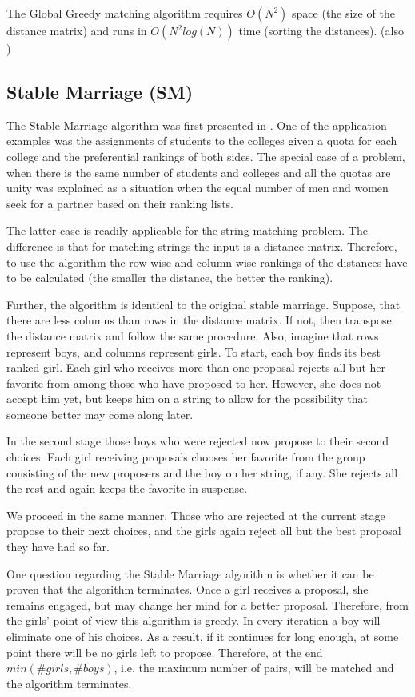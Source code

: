 \documentclass[a4paper,11pt]{article}
\begin{document}
The Global Greedy matching algorithm requires $O(N^2)$ space (the size of the distance matrix) and runs in $O(N^2 log(N))$ time (sorting the distances). (also \cite{augsten})

\subsection{Stable Marriage (SM)}

The Stable Marriage algorithm was first presented in \cite{gale}. One of the application examples was the assignments of students to the colleges given a quota for each college and the preferential rankings of both sides. The special case of a problem, when there is the same number of students and colleges and all the quotas are unity was explained as a situation when the equal number of men and women seek for a partner based on their ranking lists.

The latter case is readily applicable for the string matching problem. The difference is that for matching strings the input is a distance matrix. Therefore, to use the algorithm the row-wise and column-wise rankings of the distances have to be calculated (the smaller the distance, the better the ranking).

Further, the algorithm is identical to the original stable marriage. Suppose, that there are less columns than rows in the distance matrix. If not, then transpose the distance matrix and follow the same procedure. Also, imagine that rows represent boys, and columns represent girls. To start, each boy finds its best ranked girl. Each girl who receives more than one proposal rejects all but her favorite from among those who have proposed to her. However, she does not accept him yet, but keeps him on a string to allow for the possibility that someone better may come along later.

In the second stage those boys who were rejected now propose to their second choices. Each girl receiving proposals chooses her favorite from the group consisting of the new proposers and the boy on her string, if any. She rejects all the rest and again keeps the favorite in suspense.

We proceed in the same manner. Those who are rejected at the current stage propose to their next choices, and the girls again reject all but the best proposal they have had so far.

One question regarding the Stable Marriage algorithm is whether it can be proven that the algorithm terminates. Once a girl receives a proposal, she remains engaged, but may change her mind for a better proposal. Therefore, from the girls' point of view this algorithm is greedy. In every iteration a boy will eliminate one of his choices. As a result, if it continues for long enough, at some point there will be no girls left to propose. Therefore, at the end $min(\#girls, \#boys)$, i.e. the maximum number of pairs, will be matched and the algorithm terminates.
\end{document}
